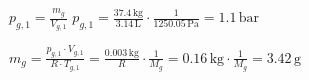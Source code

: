 \( p_{g,1} = \frac{m_g}{V_{g,1}} \)  
\( p_{g,1} = \frac{37.4 \, \text{kg}}{3.14 \, \text{L}} \cdot \frac{1}{1250.05 \, \text{Pa}} = 1.1 \, \text{bar} \)  

\( m_g = \frac{p_{g,1} \cdot V_{g,1}}{R \cdot T_{g,1}} = \frac{0.003 \, \text{kg}}{R} \cdot \frac{1}{M_g} = 0.16 \, \text{kg} \cdot \frac{1}{M_g} = 3.42 \, \text{g} \)